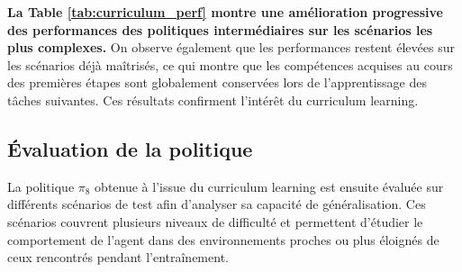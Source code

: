 \vspace{10pt}

\noindent \textbf{La Table \ref{tab:curriculum_perf} montre une amélioration progressive des performances des politiques intermédiaires sur les scénarios les plus complexes.} On observe également que les performances restent élevées sur les scénarios déjà maîtrisés, ce qui montre que les compétences acquises au cours des premières étapes sont globalement conservées lors de l'apprentissage des tâches suivantes. Ces résultats confirment l'intérêt du curriculum learning.




\subsection{Évaluation de la politique}

\noindent La politique $\pi_8$ obtenue à l'issue du curriculum learning est ensuite évaluée sur différents scénarios de test afin d'analyser sa capacité de généralisation. Ces scénarios couvrent plusieurs niveaux de difficulté et permettent d'étudier le comportement de l'agent dans des environnements proches ou plus éloignés de ceux rencontrés pendant l'entraînement.

